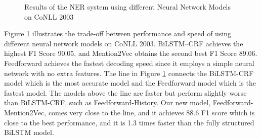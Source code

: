 \begin{figure}[h]
\centering
{}
 \caption{Results of the NER system using different Neural Network Models on CoNLL 2003}
  \label{fig:ner}
\end{figure}

Figure \ref{fig:ner} illustrates the trade-off between performance and speed of using different neural network models on CoNLL 2003. BiLSTM--CRF achieves the highest F1 Score 90.05, and Mention2Vec obtains the second best F1 Score 89.06. Feedforward achieves the fastest decoding speed since it employs a simple neural network with no extra features. The line in Figure \ref{fig:ner} connects the BiLSTM-CRF model which is the most accurate model and the Feedforward model which is the fastest model. The models above the line are faster but perform slightly worse than BiLSTM-CRF, such as Feedforward-History. Our new model, Feedforward-Mention2Vec, comes very close to the line, and it achieves 88.6 F1 score which is close to the best performance, and it is 1.3 times faster than the fully structured BiLSTM model.


